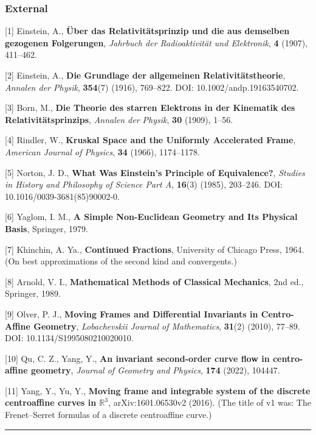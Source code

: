 \documentclass[
  a4paper,
]{article}
\begin{document}
\subsubsection{External}\label{external}

{[}1{]} Einstein, A., \textbf{Über das Relativitätsprinzip und die aus
demselben gezogenen Folgerungen}, \emph{Jahrbuch der Radioaktivität und
Elektronik}, \textbf{4} (1907), 411--462.

{[}2{]} Einstein, A., \textbf{Die Grundlage der allgemeinen
Relativitätstheorie}, \emph{Annalen der Physik}, \textbf{354}(7) (1916),
769--822. DOI: 10.1002/andp.19163540702.

{[}3{]} Born, M., \textbf{Die Theorie des starren Elektrons in der
Kinematik des Relativitätsprinzips}, \emph{Annalen der Physik},
\textbf{30} (1909), 1--56.

{[}4{]} Rindler, W., \textbf{Kruskal Space and the Uniformly Accelerated
Frame}, \emph{American Journal of Physics}, \textbf{34} (1966),
1174--1178.

{[}5{]} Norton, J. D., \textbf{What Was Einstein's Principle of
Equivalence?}, \emph{Studies in History and Philosophy of Science Part
A}, \textbf{16}(3) (1985), 203--246. DOI: 10.1016/0039-3681(85)90002-0.

{[}6{]} Yaglom, I. M., \textbf{A Simple Non-Euclidean Geometry and Its
Physical Basis}, Springer, 1979.

{[}7{]} Khinchin, A. Ya., \textbf{Continued Fractions}, University of
Chicago Press, 1964. (On best approximations of the second kind and
convergents.)

{[}8{]} Arnold, V. I., \textbf{Mathematical Methods of Classical
Mechanics}, 2nd ed., Springer, 1989.

{[}9{]} Olver, P. J., \textbf{Moving Frames and Differential Invariants
in Centro-Affine Geometry}, \emph{Lobachevskii Journal of Mathematics},
\textbf{31}(2) (2010), 77--89. DOI: 10.1134/S1995080210020010.

{[}10{]} Qu, C. Z., Yang, Y., \textbf{An invariant second-order curve
flow in centro-affine geometry}, \emph{Journal of Geometry and Physics},
\textbf{174} (2022), 104447.

{[}11{]} Yang, Y., Yu, Y., \textbf{Moving frame and integrable system of
the discrete centroaffine curves in \(\mathbb R^3\)}, arXiv:1601.06530v2
(2016). (The title of v1 was: The Frenet--Serret formulas of a discrete
centroaffine curve.)

\begin{center}\rule{0.5\linewidth}{0.5pt}\end{center}
\end{document}

